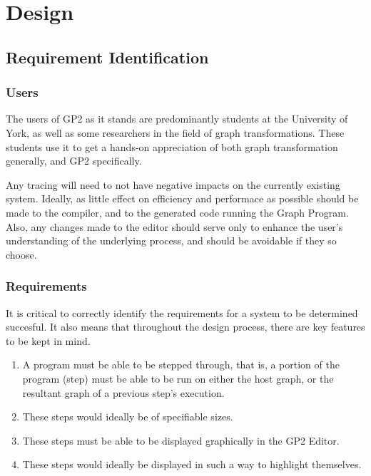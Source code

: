 \documentclass{UoYCSproject}
\begin{document}



\chapter{Design}
\section{Requirement Identification}

\subsection{Users}
The users of GP2 as it stands are predominantly students at the University of York, as well as some researchers in the field of graph transformations. These students use it to get a hands-on appreciation of both graph transformation generally, and GP2 specifically.

Any tracing will need to not have negative impacts on the currently existing system. Ideally, as little effect on efficiency and performace as possible should be made to the compiler, and to the generated code running the Graph Program. Also, any changes made to the editor should serve only to enhance the user's understanding of the underlying process, and should be avoidable if they so choose.

\subsection{Requirements}
It is critical to correctly identify the requirements for a system to be determined succesful. It also means that throughout the design process, there are key features to be kept in mind. 
\begin{enumerate}
	\item A program must be able to be stepped through, that is, a portion of the program (step) must be able to be run on either the host graph, or the resultant graph of a previous step's execution.
	\item These steps would ideally be of specifiable sizes.
	\item These steps must be able to be displayed graphically in the GP2 Editor.
	\item These steps would ideally be displayed in such a way to highlight themselves.
\end{enumerate}
\end{document}
